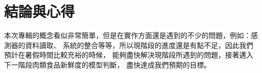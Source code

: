 \chapter{結論與心得}

本次專輯的概念看似非常簡單，但是在實作方面還是遇到的不少的問題，例如：感測器的資料讀取、
系統的整合等等，所以現階段的進度還是有點不足，因此我們預計在暑假時間比較充裕的時候，
能夠盡快解決現階段所遇到的問題，接著邁入下一階段肉類食品新鮮度的模型判斷，
盡快達成我們預期的目標。
